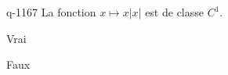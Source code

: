 \begin{truefalse}{q-1167}
La fonction $x\mapsto x|x|$ est de classe $C^1$.
\item* Vrai
\item Faux
\end{truefalse}

